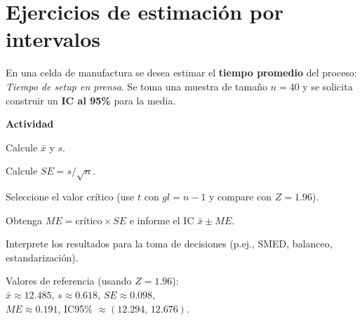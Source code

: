 \section{Ejercicios de estimación por intervalos}


\begin{ejercicio}[Tiempo de \emph{setup} en prensa (n=40)]
En una celda de manufactura se desea estimar el \textbf{tiempo promedio} del proceso: \emph{Tiempo de \emph{setup} en prensa}.
Se toma una muestra de tamaño $n=40$ y se solicita construir un \textbf{IC al 95\%} para la media.


\textbf{Actividad}
\begin{pasos}
  \item Calcule $\bar{x}$ y $s$.
  \item Calcule $SE = s/\sqrt{n}$.
  \item Seleccione el valor crítico (use $t$ con $gl=n-1$ y compare con $Z=1.96$).
  \item Obtenga $ME=\text{crítico}\times SE$ e informe el IC $\bar{x}\pm ME$.
  \item Interprete los resultados para la toma de decisiones (p.ej., SMED, balanceo, estandarización).
\end{pasos}

\begin{clave}
\noindent Valores de referencia (usando $Z=1.96$):\\
$\bar{x} \approx 12.485$, \quad $s \approx 0.618$, \quad $SE \approx 0.098$,\\
$ME \approx 0.191$, \quad IC95\% $\approx (12.294,\, 12.676)$.
\end{clave}
\end{ejercicio}


